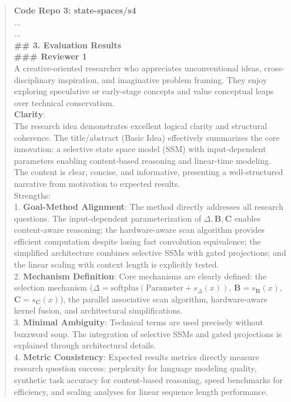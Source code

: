 \begin{quote}
\begin{tcolorbox}[breakable,colback=almond!20!white, colframe=almond!60!black, title=\textbf{Case Study (Mamba: Linear-Time Sequence Modeling with Selective State Spaces)}]
        \textbf{Code Repo 3: state-spaces/s4}\\
        ...\\
        
        ...\\

        \textbf{\#\# 3. Evaluation Results}\\

        \textbf{\#\#\# Reviewer 1}\\
        A creative-oriented researcher who appreciates unconventional ideas, cross-disciplinary inspiration, and imaginative problem framing. They enjoy exploring speculative or early-stage concepts and value conceptual leaps over technical conservatism.\\
        \textbf{Clarity}:\\
        The research idea demonstrates excellent logical clarity and structural coherence. The title/abstract (Basic Idea) effectively summarizes the core innovation: a selective state space model (SSM) with input-dependent parameters enabling content-based reasoning and linear-time modeling. The content is clear, concise, and informative, presenting a well-structured narrative from motivation to expected results.\\
        Strengths:\\
        1. \textbf{Goal-Method Alignment}: The method directly addresses all research questions. The input-dependent parameterization of $\Delta, \boldsymbol{B}, \boldsymbol{C}$ enables content-aware reasoning; the hardware-aware scan algorithm provides efficient computation despite losing fast convolution equivalence; the simplified architecture combines selective SSMs with gated projections; and the linear scaling with context length is explicitly tested.\\
        2. \textbf{Mechanism Definition}: Core mechanisms are clearly defined: the selection mechanism ($\Delta = \textrm{softplus}(\textrm{Parameter} + s_\Delta(x))$, $\boldsymbol{B} = s_{\boldsymbol{B}}(x)$, $\boldsymbol{C} = s_{\boldsymbol{C}}(x)$), the parallel associative scan algorithm, hardware-aware kernel fusion, and architectural simplifications.\\
        3. \textbf{Minimal Ambiguity}: Technical terms are used precisely without buzzword soup. The integration of selective SSMs and gated projections is explained through architectural details.\\
        4. \textbf{Metric Consistency}: Expected results metrics directly measure research question success: perplexity for language modeling quality, synthetic task accuracy for content-based reasoning, speed benchmarks for efficiency, and scaling analyses for linear sequence length performance.\\

\end{tcolorbox}
\end{quote}
